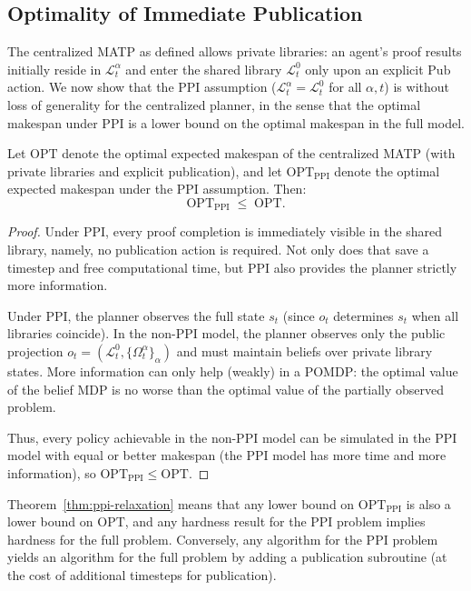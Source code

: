 \subsection{Optimality of Immediate Publication}\label{sec:ppi-wlog}

The centralized MATP as defined allows private libraries: an agent's proof results initially reside in $\mathcal{L}^\alpha_t$ and enter the shared library $\mathcal{L}^0_t$ only upon an explicit $\mathrm{Pub}$ action. We now show that the PPI assumption ($\mathcal{L}^\alpha_t = \mathcal{L}^0_t$ for all $\alpha,t$) is without loss of generality for the centralized planner, in the sense that the optimal makespan under PPI is a lower bound on the optimal makespan in the full model.

\begin{theorem}\label{thm:ppi-relaxation}
Let $\mathrm{OPT}$ denote the optimal expected makespan of the centralized MATP (with private libraries and explicit publication), and let $\mathrm{OPT}_{\mathrm{PPI}}$ denote the optimal expected makespan under the PPI assumption. Then:
\[
\mathrm{OPT}_{\mathrm{PPI}} \;\le\; \mathrm{OPT}.
\]
\end{theorem}

\begin{proof}
Under PPI, every proof completion is immediately visible in the shared library, namely, no publication action is required. Not only does that save a timestep and free computational time, but PPI also provides the planner strictly more information.

Under PPI, the planner observes the full state $s_t$ (since $o_t$ determines $s_t$ when all libraries coincide). In the non-PPI model, the planner observes only the public projection $o_t = (\mathcal{L}^0_t, \{\Omega^\alpha_t\}_\alpha)$ and must maintain beliefs over private library states. More information can only help (weakly) in a POMDP: the optimal value of the belief MDP is no worse than the optimal value of the partially observed problem.

Thus, every policy achievable in the non-PPI model can be simulated in the PPI model with equal or better makespan (the PPI model has more time and more information), so $\mathrm{OPT}_{\mathrm{PPI}} \le \mathrm{OPT}$.
\end{proof}

\begin{remark}
Theorem~\ref{thm:ppi-relaxation} means that any lower bound on $\mathrm{OPT}_{\mathrm{PPI}}$ is also a lower bound on $\mathrm{OPT}$, and any hardness result for the PPI problem implies hardness for the full problem. Conversely, any algorithm for the PPI problem yields an algorithm for the full problem by adding a publication subroutine (at the cost of additional timesteps for publication).
\end{remark}

